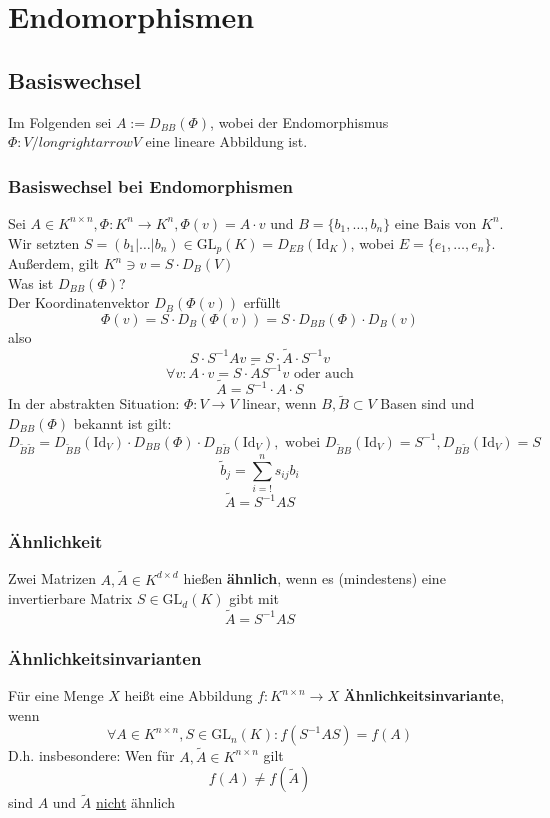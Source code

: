 \documentclass{kit}
\begin{document}
\section{Endomorphismen}
  \subsection{Basiswechsel}
  Im Folgenden sei $A:=D_{BB}(\Phi)$, wobei der Endomorphismus $\Phi:V/longrightarrow V$ eine lineare Abbildung ist.
    \subsubsection{Basiswechsel bei Endomorphismen}
      Sei $A\in K^{n\times n},\Phi:K^n\longrightarrow K^n,\Phi(v)=A\cdot v$ und $B=\{b_1,\dots,b_n\}$ eine Bais von $K^n$. Wir setzten $S=(b_1|\dots|b_n)\in\text{GL}_p(K)=D_{EB}(\text{Id}_K)$, 
      wobei $E=\{e_1,\dots,e_n\}$. Außerdem, gilt $K^n\ni v=S\cdot D_B(V)$\\
      Was ist $D_{BB}(\Phi)$?\\
      Der Koordinatenvektor $D_B(\Phi(v))$ erfüllt
      $$\Phi(v)=S\cdot D_B(\Phi(v))=S\cdot D_{BB}(\Phi)\cdot D_B(v)$$
      also
      $$S\cdot S^{-1}Av=S\cdot\tilde A\cdot S^{-1}v$$
      $$\forall v:A\cdot v=S\cdot\tilde AS^{-1}v\text{   oder auch}$$
      $$\tilde A=S^{-1}\cdot A\cdot S$$
      In der abstrakten Situation: $\Phi:V\longrightarrow V$ linear, wenn $B,\tilde B\subset V$ Basen sind und $D_{BB}(\Phi)$ bekannt ist gilt:
      $$D_{\tilde B\tilde B}=D_{\tilde BB}(\text{Id}_V)\cdot D_{BB}(\Phi)\cdot D_{B\tilde B}(\text{Id}_V),\text{ wobei } D_{\tilde BB}(\text{Id}_V)=S^{-1},D_{B\tilde B}(\text{Id}_V)=S$$
      $$\tilde b_j=\sum_{i=!}^ns_{ij}b_i$$
      $$\tilde A=S^{-1}AS$$
    \subsubsection{Ähnlichkeit}
      Zwei Matrizen $A,\tilde A\in K^{d\times d}$ hießen \textbf{ähnlich}, wenn es (mindestens) eine invertierbare Matrix $S\in\text{GL}_d(K)$ gibt mit
      $$\tilde A=S^{-1}AS$$
    \subsubsection{Ähnlichkeitsinvarianten}
      Für eine Menge $X$ heißt eine Abbildung $f:K^{n\times n}\longrightarrow X$ \textbf{Ähnlichkeitsinvariante}, wenn
      $$\forall A\in K^{n\times n},S\in\text{GL}_n(K):f(S^{-1}AS)=f(A)$$
      D.h. insbesondere: Wen für $A,\tilde A\in K^{n\times n}$ gilt
      $$f(A)\neq f(\tilde A)$$
      sind $A$ und $\tilde A$ \underline{nicht} ähnlich
\end{document}
